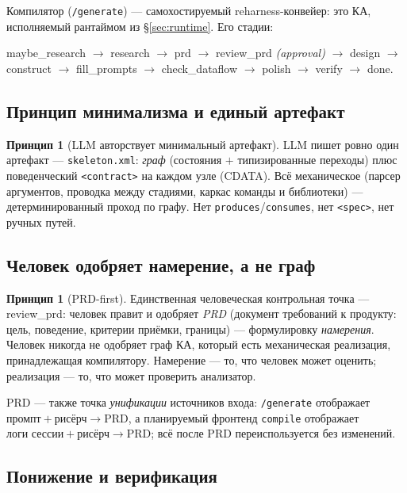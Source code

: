 \documentclass[11pt]{article}
\theoremstyle{plain}
\theoremstyle{definition}
\newtheorem{principle}[theorem]{Принцип}
\theoremstyle{remark}
\newcommand{\reharness}{\textsf{reharness}}
\newcommand{\code}[1]{\texttt{#1}}
\newcommand{\state}[1]{\textsf{#1}}
\begin{document}
Компилятор (\code{/generate}) --- самохостируемый \reharness{}-конвейер: это КА,
исполняемый рантаймом из \S\ref{sec:runtime}. Его стадии:
\begin{center}\small
\state{maybe\_research} $\to$ \state{research} $\to$ \state{prd} $\to$
\state{review\_prd} \emph{(approval)} $\to$ \state{design} $\to$ \state{construct}
$\to$ \state{fill\_prompts} $\to$ \state{check\_dataflow} $\to$ \state{polish}
$\to$ \state{verify} $\to$ \state{done}.
\end{center}

\subsection{Принцип минимализма и единый артефакт}

\begin{principle}[LLM авторствует минимальный артефакт]\label{prin:lean}
LLM пишет ровно один артефакт --- \code{skeleton.xml}: \emph{граф} (состояния $+$
типизированные переходы) плюс поведенческий \code{<contract>} на каждом узле (CDATA). Всё
механическое (парсер аргументов, проводка между стадиями, каркас команды и библиотеки) ---
детерминированный проход по графу. Нет \code{produces}/\code{consumes}, нет
\code{<spec>}, нет ручных путей.
\end{principle}

\subsection{Человек одобряет намерение, а не граф}

\begin{principle}[PRD-first]\label{prin:prd}
Единственная человеческая контрольная точка --- \state{review\_prd}: человек правит и
одобряет \emph{PRD} (документ требований к продукту: цель, поведение, критерии приёмки,
границы) --- формулировку \emph{намерения}. Человек никогда не одобряет граф КА, который
есть механическая реализация, принадлежащая компилятору. Намерение --- то, что человек
может оценить; реализация --- то, что может проверить анализатор.
\end{principle}

PRD --- также точка \emph{унификации} источников входа: \code{/generate} отображает
$\text{промпт} + \text{рисёрч} \to \text{PRD}$, а планируемый фронтенд \code{compile}
отображает $\text{логи сессии} + \text{рисёрч} \to \text{PRD}$; всё после PRD
переиспользуется без изменений.

\subsection{Понижение и верификация}
\end{document}
